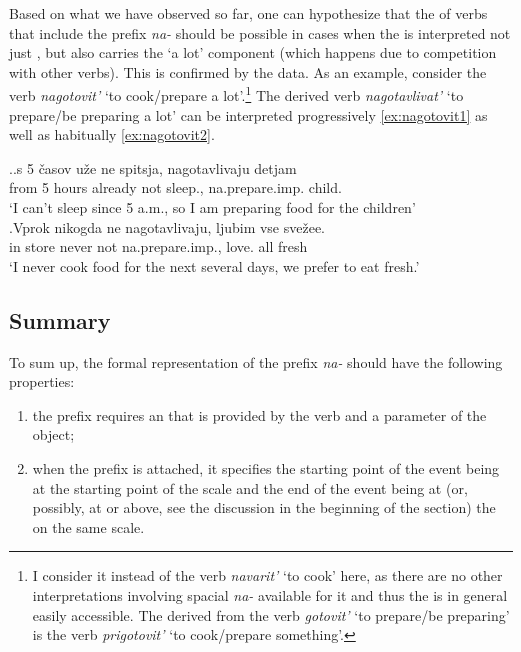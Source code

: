 Based on what we have observed so far, one can hypothesize that the  of  verbs that include the  prefix \textit{na-} should be possible in cases when the  is interpreted not just , but also carries the `a lot' component (which happens due to competition with other verbs). This is confirmed by the data. As an example, consider the verb \textit{nagotovit'} `to cook/prepare a lot'.\footnote{I consider it instead of the verb \textit{navarit'} `to cook' here, as there are no other interpretations involving spacial \textit{na-} available for it and thus the  is in general easily accessible. The  derived from the verb \textit{gotovit'} `to prepare/be preparing' is the verb \textit{prigotovit'} `to cook/prepare something'.}  The derived  verb \textit{nagotavlivat'} `to prepare/be preparing a lot' can be interpreted progressively \ref{ex:nagotovit1} as well as habitually \ref{ex:nagotovit2}.

\ex.\label{ex:nagotovit}\ag.\label{ex:nagotovit1}s 5 \v{c}asov u\v{z}e ne spitsja, nagotavlivaju detjam\\
from 5 hours already not sleep., na.prepare.imp. child.\\
\trans `I can't sleep since 5 a.m., so I am preparing food for the children'\\
\bg.\label{ex:nagotovit2}Vprok nikogda ne nagotavlivaju, ljubim vse sve\v{z}ee.\\
{in store} never not na.prepare.imp., love. all fresh\\
\trans `I never cook food for the next several days, we prefer to eat fresh.'\\

\subsection{Summary} 
To sum up, the formal representation of the  prefix \textit{na-} should have the following properties: 
\begin{enumerate}
\item the prefix requires an  that is provided by the verb and a parameter of the object;
\item when the prefix is attached, it specifies the starting point of the event being at the starting point of the scale and the end of the event being at (or, possibly, at or above, see the discussion in the beginning of the section) the  on the same scale.
\end{enumerate}

